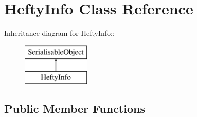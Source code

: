 \hypertarget{classHeftyInfo}{
\section{HeftyInfo Class Reference}
\label{classHeftyInfo}
}
Inheritance diagram for HeftyInfo::\begin{figure}[H]
\begin{center}
\leavevmode
\includegraphics[height=2cm]{classHeftyInfo}
\end{center}
\end{figure}
\subsection*{Public Member Functions}
